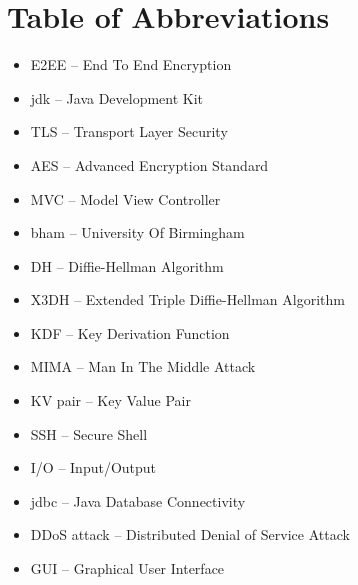 \section*{Table of Abbreviations}
\begin{itemize}[nolistsep]
\item E2EE -- End To End Encryption
\item jdk -- Java Development Kit
\item TLS -- Transport Layer Security
\item AES -- Advanced Encryption Standard
\item MVC -- Model View Controller
\item bham -- University Of Birmingham
\item DH -- Diffie-Hellman Algorithm
\item X3DH -- Extended Triple Diffie-Hellman Algorithm
\item KDF -- Key Derivation Function
\item MIMA -- Man In The Middle Attack
\item KV pair -- Key Value Pair
\item SSH -- Secure Shell
\item I/O -- Input/Output
\item jdbc -- Java Database Connectivity
\item DDoS attack -- Distributed Denial of Service Attack
\item GUI -- Graphical User Interface
\end{itemize}